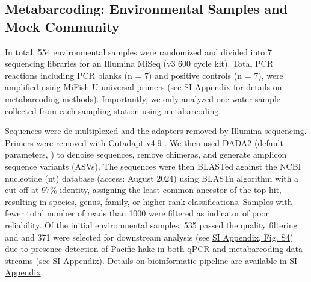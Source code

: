\documentclass{article}
\begin{document}
\subsection*{Metabarcoding: Environmental Samples and Mock Community}
In total, 554 environmental samples were randomized and divided into 7 sequencing libraries for an Illumina MiSeq (v3 600 cycle kit). Total PCR reactions including PCR blanks (n = 7) and positive controls (n = 7), were amplified using MiFish-U universal primers \cite{miya2015} (see \href{SI_Appendix.pdf}{SI Appendix} for details on metabarcoding methods). Importantly, we only analyzed one water sample collected from each sampling station using metabarcoding.

Sequences were de-multiplexed and the adapters removed by Illumina sequencing. Primers were removed with Cutadapt v4.9 \cite{martin2011}. We then used DADA2 (default parameters, \cite{callahan2016}) to denoise sequences, remove chimeras, and generate amplicon sequence variants (ASVs). The sequences were then BLASTed against the NCBI nucleotide (nt) database (access: August 2024) using BLASTn algorithm with a cut off at 97\% identity, assigning the least common ancestor of the top hit, resulting in species, genus, family, or higher rank classifications.  Samples with fewer total number of reads than 1000 were filtered as indicator of poor reliability. Of the initial environmental samples, 535 passed the quality filtering and and 371 were selected for downstream analysis (see \href{SI_Appendix.pdf}{SI Appendix, Fig. S4}) due to presence detection of Pacific hake in both qPCR and metabarcoding data streams (see \href{SI_Appendix.pdf}{SI Appendix}). Details on bioinformatic pipeline are available in \href{SI_Appendix.pdf}{SI Appendix}. 
\end{document}
